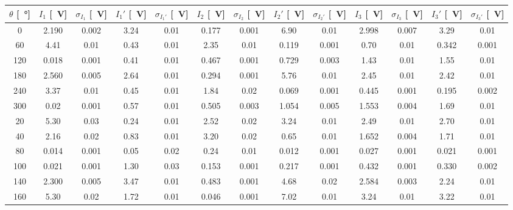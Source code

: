 \documentclass[10pt,oneside,a4paper]{article}
\newenvironment{Figure}
  {\par\medskip\noindent\minipage{\linewidth}}
  {\endminipage\par\medskip}
\begin{document}
\vspace{2cm}

\centering
{}
\label{tab:ultima}
\begin{tabular}{c|c|c|c|c|c|c|c|c|c|c|c|c}
$\theta$ [\SI{}{\degree}] & $I_1$ [\SI{}{V}] & $\sigma_{I_1}$ [\SI{}{V}] & $I_1'$ [\SI{}{V}] & $\sigma_{I_1'}$ [\SI{}{V}] & $I_2$ [\SI{}{V}] & $\sigma_{I_2}$ [\SI{}{V}] & $I_2'$ [\SI{}{V}] & $\sigma_{I_2'}$ [\SI{}{V}] & $I_3$ [\SI{}{V}] & $\sigma_{I_3}$ [\SI{}{V}] & $I_3'$ [\SI{}{V}] & $\sigma_{I_3'}$ [\SI{}{V}]  \\
\hline
  0 & 2.190 & 0.002 & 3.24 & 0.01 & 0.177 & 0.001 & 6.90 & 0.01 & 2.998 & 0.007 & 3.29 & 0.01 \\
  60 & 4.41 & 0.01 & 0.43 & 0.01 & 2.35 & 0.01 & 0.119 & 0.001 & 0.70 & 0.01 & 0.342 & 0.001 \\
 120 & 0.018 & 0.001 & 0.41 & 0.01 & 0.467 & 0.001 & 0.729 & 0.003 & 1.43 & 0.01 & 1.55 & 0.01 \\
 180 & 2.560 & 0.005 & 2.64 & 0.01 & 0.294 & 0.001 & 5.76 & 0.01 & 2.45 & 0.01 & 2.42 & 0.01 \\
 240 & 3.37 & 0.01 & 0.45 & 0.01 & 1.84 & 0.02 & 0.069 & 0.001 & 0.445 & 0.001 & 0.195 & 0.002 \\
 300 & 0.02 & 0.001 & 0.57 & 0.01 & 0.505 & 0.003 & 1.054 & 0.005 & 1.553 & 0.004 & 1.69 & 0.01 \\
  20 & 5.30 & 0.03 & 0.24 & 0.01 & 2.52 & 0.02 & 3.24 & 0.01 & 2.49 & 0.01 & 2.70 & 0.01 \\
  40 & 2.16 & 0.02 & 0.83 & 0.01 & 3.20 & 0.02 & 0.65 & 0.01 & 1.652 & 0.004 & 1.71 & 0.01 \\
  80 & 0.014 & 0.001 & 0.05 & 0.02 & 0.24 & 0.01 & 0.012 & 0.001 & 0.027 & 0.001 & 0.021 & 0.001 \\
 100 & 0.021 & 0.001 & 1.30 & 0.03 & 0.153 & 0.001 & 0.217 & 0.001 & 0.432 & 0.001 & 0.330 & 0.002 \\
 140 & 2.300 & 0.005 & 3.47 & 0.01 & 0.483 & 0.001 & 4.68 & 0.02 & 2.584 & 0.003 & 2.24 & 0.01 \\
 160 & 5.30 & 0.02 & 1.72 & 0.01 & 0.046 & 0.001 & 7.02 & 0.01 & 3.24 & 0.01 & 3.22 & 0.01 \\
 \hline
\end{tabular}
 
 
 
\end{document}

